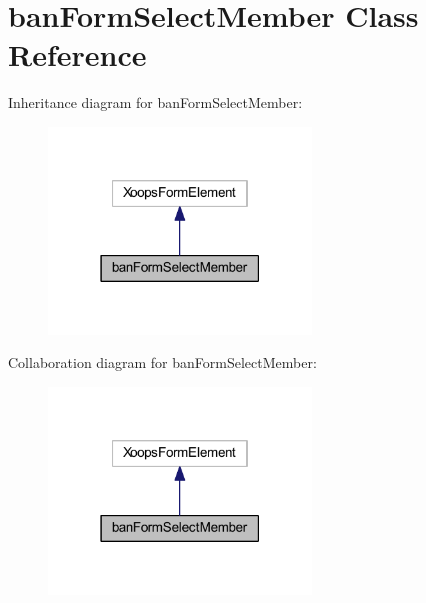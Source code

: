 \hypertarget{classban_form_select_member}{\section{ban\-Form\-Select\-Member Class Reference}
\label{classban_form_select_member}
}


Inheritance diagram for ban\-Form\-Select\-Member\-:
\nopagebreak
\begin{figure}[H]
\begin{center}
\leavevmode
\includegraphics[width=198pt]{classban_form_select_member__inherit__graph}
\end{center}
\end{figure}


Collaboration diagram for ban\-Form\-Select\-Member\-:
\nopagebreak
\begin{figure}[H]
\begin{center}
\leavevmode
\includegraphics[width=198pt]{classban_form_select_member__coll__graph}
\end{center}
\end{figure}
